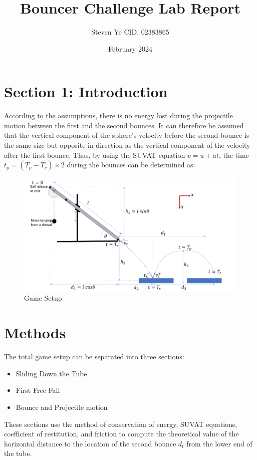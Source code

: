 \documentclass{article}
\title{Bouncer Challenge Lab Report}
\author{Steven Ye CID: 02383865}
\date{February 2024}
\begin{document}
\maketitle
\newpage
\tableofcontents
\newpage
\section{Section 1: Introduction}
        According to the assumptions, there is no energy lost during the projectile motion between the first and the second bounces. It can therefore be assumed that the vertical component of the sphere's velocity before the second bounce is the same size but opposite in direction as the vertical component of the velocity after the first bounce. Thus, by using the SUVAT equation $v = u + at$, the time $t_p = (T_p - T_c)\times2 $ during the bounces can be determined as:
\begin{figure}[H]
    \centering
    \includegraphics[width=1\linewidth]{Gamesetup.png}
    \caption{Game Setup}
    \label{fig:game_setup}
\end{figure}
\newpage
\section{Methods}
    The total game setup can be separated into three sections:
    \begin{itemize}
        \item Sliding Down the Tube
        \item First Free Fall
        \item Bounce and Projectile motion
    \end{itemize}
    These sections use the method of conservation of energy, SUVAT equations, coefficient of restitution, and friction to compute the theoretical value of the horizontal distance to the location of the second bounce $d_t$ from the lower end of the tube.
    
\end{document}
